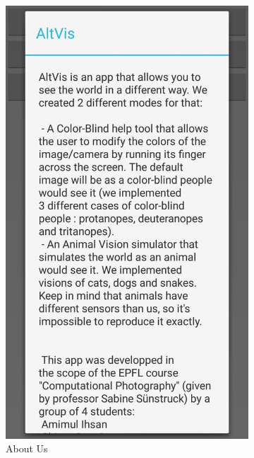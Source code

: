 \documentclass[12pt]{article}
\begin{document}
\begin{figure}[h]
\begin{subfigure}{.25\textwidth}
	\includegraphics[width=.9\linewidth]{ApplicationScreenshots/AboutUs.jpg}
	\caption*{About Us}
\end{subfigure}%
\begin{subfigure}{.25\textwidth}
	\centering

\end{subfigure}
\end{figure}
\end{document}
